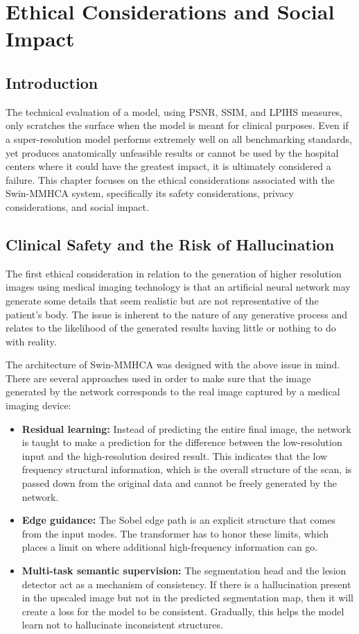 \chapter{Ethical Considerations and Social Impact}

\section{Introduction}
The technical evaluation of a model, using PSNR, SSIM, and LPIHS measures, only scratches the surface when the model is meant for clinical purposes. Even if a super-resolution model performs extremely well on all benchmarking standards, yet produces anatomically unfeasible results or cannot be used by the hospital centers where it could have the greatest impact, it is ultimately considered a failure. This chapter focuses on the ethical considerations associated with the Swin-MMHCA system, specifically its safety considerations, privacy considerations, and social impact.

\section{Clinical Safety and the Risk of Hallucination}
The first ethical consideration in relation to the generation of higher resolution images using medical imaging technology is that an artificial neural network may generate some details that seem realistic but are not representative of the patient's body. The issue is inherent to the nature of any generative process and relates to the likelihood of the generated results having little or nothing to do with reality.

The architecture of Swin-MMHCA was designed with the above issue in mind. There are several approaches used in order to make sure that the image generated by the network corresponds to the real image captured by a medical imaging device:

\begin{itemize}
    \item \textbf{Residual learning:} Instead of predicting the entire final image, the network is taught to make a prediction for the difference between the low-resolution input and the high-resolution desired result. This indicates that the low frequency structural information, which is the overall structure of the scan, is passed down from the original data and cannot be freely generated by the network.
    \item \textbf{Edge guidance:} The Sobel edge path is an explicit structure that comes from the input modes. The transformer has to honor these limits, which places a limit on where additional high-frequency information can go.
    \item \textbf{Multi-task semantic supervision:} The segmentation head and the lesion detector act as a mechanism of consistency. If there is a hallucination present in the upscaled image but not in the predicted segmentation map, then it will create a loss for the model to be consistent. Gradually, this helps the model learn not to hallucinate inconsistent structures.
\end{itemize}

